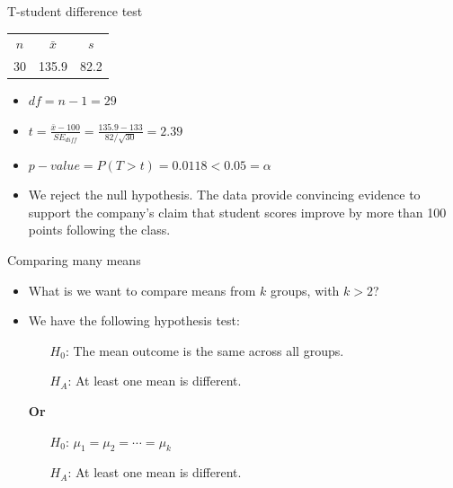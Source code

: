 \documentclass[12pt,a4paper]{beamer}
\begin{document}
\begin{frame}{T-student difference test}
	\begin{table}[h]
	\centering
	\begin{tabular}{ccc}
	\hline
	$n$ & $\bar{x}$ & $s$  \\
	30   & 135.9	  & 82.2 \\
	\hline
	\end{tabular}
	\end{table}
	\begin{itemize}
		\item $df=n-1=29$
		\vspace{0.3cm}
		\item  $t=\frac{\bar{x}-100}{SE_{diff}}=\frac{135.9-133}{82/\sqrt{30}}=2.39$
		\item $p-value=P(T>t)=0.0118<0.05=\alpha$
		\item We reject the null hypothesis. The data provide convincing evidence to support the company's claim that student scores improve by more than 100 points following the class.
	\end{itemize}
\end{frame}
\begin{frame}{Comparing many means}
	\begin{itemize}
		\item What is we want to compare means from $k$ groups, with $k>2$?
		\item We have the following hypothesis test: 
		\begin{itemize}
		\setlength{\itemsep}{0mm}
		\item [$H_0$:]The mean outcome is the same across all groups.
		\item [$H_A$:] At least one mean is different.
		\end{itemize}
		\textbf{Or}
		\begin{itemize}
			\setlength{\itemsep}{0mm}
			\item [$H_0$:]$\mu_1 = \mu_2 = \cdots = \mu_k$
			\item [$H_A$:] At least one mean is different.
			\end{itemize}
	\end{itemize}
\end{frame}
\end{document}
